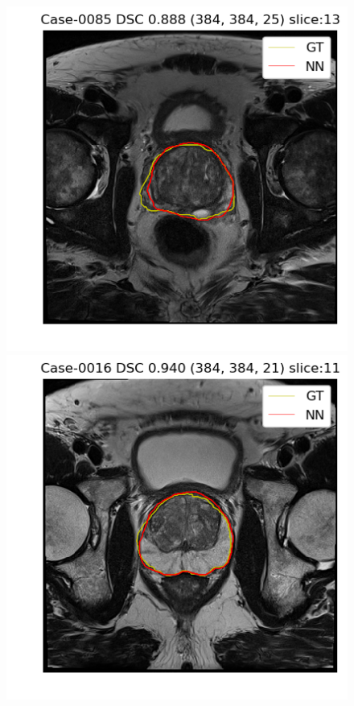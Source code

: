 \begin{figure}[h]
    \includegraphics[totalheight=.2\textheight]{figures/results/Prostate_Px_Challenge__P_yes_Original_MEAN_Case-0085.png}
    \includegraphics[totalheight=.2\textheight]{figures/results/Prostate_Px_Challenge__P_yes_Original_MAX_Case-0016.png}
    \vspace{10mm}

\end{figure}
